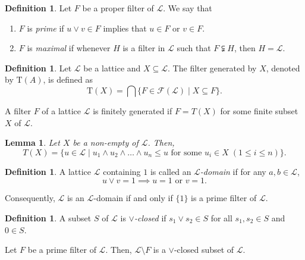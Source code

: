 \documentclass[preprint,review,10pt]{amsart}
\newtheorem{lemma}[theorem]{Lemma}
\theoremstyle{definition}
\newtheorem{definition}[theorem]{Definition}
\theoremstyle{remark}
\numberwithin{equation}{section}
\begin{document}
\begin{definition}
\cite{Birkhoff} Let  $F$ be a proper filter of $\mathscr{L}$. We say that 
\begin{enumerate}
\item $F$ is \textit{prime} if $u \vee v \in F$ implies that $u \in F$ or $v \in F$.
\item  $F$ is  \textit{maximal} if whenever $H$ is a filter in $\mathscr{L}$ such that $F \subsetneqq H$, then $H = \mathscr{L}$.
\end{enumerate}
\end{definition}


\begin{definition} \cite{Atani1}
Let $\mathscr{L}$ be a lattice and $X \subseteq \mathscr{L}$.  The filter generated by $X$, denoted by $\text{T}(A)$,  is defined as 
$$\text{T}(X) = \bigcap \{ F \in  \mathcal{F}(\mathscr{L}) \mid   X \subseteq F \}.$$
\end{definition}

A filter $F$ of a lattice $\mathscr{L}$ is   finitely generated if $F = T(X)$ for some finite subset $X$ of $\mathscr{L}$.
\begin{lemma} \cite{Atani1}
Let $X $ be a non-empty of  $\mathscr{L}$. Then, \[T(X) = \{u \in \mathcal{L} \mid  u_1 \wedge u_2 \wedge \dots \wedge u_n \le u \text{ for some } u_i \in X \; (1 \le i \le n)\}.\]
\end{lemma}
\begin{definition}
 \cite{Atani2} A lattice $\mathscr{L}$ containing  $1$ is called an \textit{$\mathscr{L}$-domain} if for any $a, b \in \mathscr{L}$, \[ u \vee v = 1 \implies u = 1 \text{ or } v = 1.  \] 
 \end{definition}
 Consequently, $\mathscr{L}$ is an $\mathscr{L}$-domain if and only if $\{1\}$ is a prime filter of $\mathscr{L}$.

\begin{definition}
\cite{Atani2} A subset $S$ of $\mathscr{L}$ is \textit{$\vee$-closed} if  $s_1 \vee s_2 \in S$ for all $s_1, s_2 \in S$ and $0 \in S$.
\end{definition}
Let $F$ be a prime filter of $\mathscr{L}$. Then, $\mathscr{L} \setminus F$ is a $\vee$-closed subset of $\mathscr{L}$. 
\end{document}
